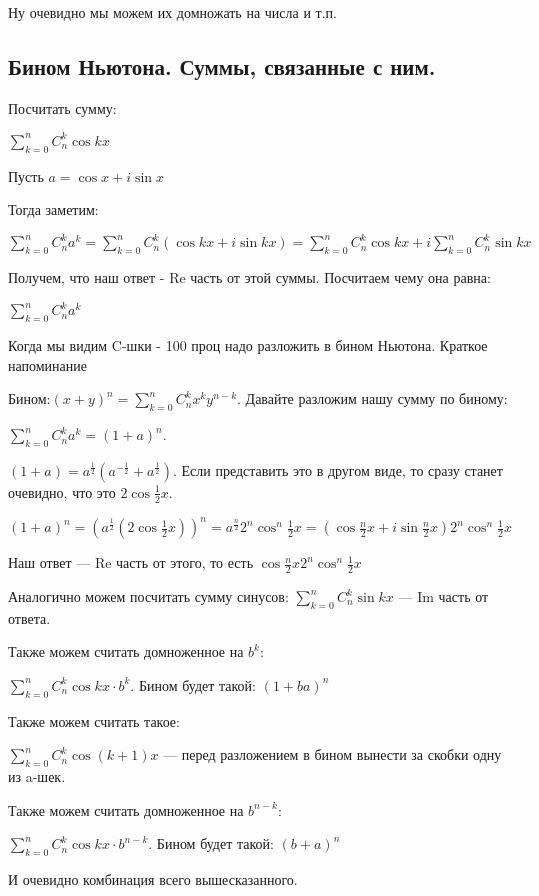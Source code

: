 \documentclass{article}
\begin{document}
Ну очевидно мы можем их домножать на числа и т.п.
\pagebreak
\subsection{Бином Ньютона. Суммы, связанные с ним.}

Посчитать сумму:

$\sum\limits_{k=0}^nC_n^k \cos kx$

Пусть $ a = \cos x + i \sin x$

Тогда заметим:

$\sum\limits_{k=0}^n C_n^k a^k =\sum\limits_{k=0}^n C_n^k (\cos kx + i\sin kx) = \sum\limits_{k=0}^n C_n^k \cos kx + i\sum\limits_{k=0}^n C_n^k \sin kx  $

Получем, что наш ответ - Re часть от этой суммы. Посчитаем чему она равна:

$\sum\limits_{k=0}^n C_n^k a^k$

Когда мы видим C-шки - 100 проц надо разложить в бином Ньютона. Краткое напоминание

Бином:$ (x+y)^n = \sum\limits_{k=0}^n C_n^k x^ky^{n-k}$. Давайте разложим нашу сумму по биному:

$\sum\limits_{k=0}^n C_n^k a^k = (1+a)^n$. 

$(1+a) = a^{\frac{1}{2}}(a^{-\frac{1}{2}}+a^{\frac{1}{2}})$. Если представить это в другом виде, то сразу станет очевидно, что это $2\cos \frac{1}{2}x$.

$(1+a)^n = (a^{\frac{1}{2}}(2\cos\frac{1}{2}x))^n = a^{\frac{n}{2}}2^n \cos^n \frac{1}{2}x = (\cos \frac{n}{2}x + i \sin \frac{n}{2}x)2^n \cos^n \frac{1}{2}x$

Наш ответ --- Re часть от этого, то есть $\cos \frac{n}{2}x 2^n \cos^n \frac{1}{2}x$

Аналогично можем посчитать сумму синусов: $\sum\limits_{k=0}^nC_n^k \sin kx$ --- Im часть от ответа.

Также можем считать домноженное на $b^k$:

$\sum\limits_{k=0}^nC_n^k \cos kx \cdot b^k$. Бином будет такой: $(1+ba)^n$

Также можем считать такое:

$\sum\limits_{k=0}^nC_n^k \cos (k+1)x$ --- перед разложением в бином вынести за скобки одну из a-шек.

Также можем считать домноженное на $b^{n-k}$:

$\sum\limits_{k=0}^nC_n^k \cos kx \cdot b^{n-k}$. Бином будет такой: $(b+a)^n$


И очевидно комбинация всего вышесказанного.
\end{document}
